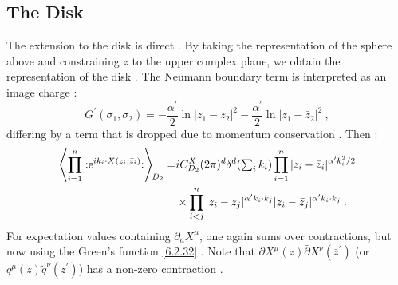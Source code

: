 \subsection*{The Disk}
The extension to the disk is direct . By taking the representation of the sphere above and constraining $z$ to the upper complex plane, we obtain the representation of the disk . The Neumann boundary term is interpreted as an image charge :
\begin{equation}
	G^{\prime}(\sigma_{1}, \sigma_{2})=-\frac{\alpha^{\prime}}{2} \ln |z_{1}-z_{2}|^{2}
	-\frac{\alpha^{\prime}}{2} \ln |z_{1}-\bar{z}_{2}|^{2} \:, \label{6.2.32}
\end{equation}
differing by a term that is dropped due to momentum conservation . Then :
\begin{align}
	\left\langle\prod_{i=1}^{n}: \mathrel{\mathrm{e}^{i k_{i} \cdot X(z_{i}, \bar{z}_{i})}}:\right\rangle \bigg._{\!\!D_{2}} 
	=& i C_{D_{2}}^{X} (2 \pi)^{d} \delta^{d}({\textstyle\sum_{i} k_{i}}) 
	\prod_{i=1}^{n}|z_{i}-\bar{z}_{i}|^{\alpha^{\prime} k_{i}^{2} / 2}  \nonumber \\
	& \times \prod_{ i<j}^{n} |z_{i}-z_{j}|^{\alpha^{\prime} k_{i} \cdot k_{j} }
	|z_{i}-\bar{z}_{j}|^{\alpha^{\prime} k_{i} \cdot k_{j}} \:. \label{6.2.33}
\end{align}
For expectation values containing $\partial_{a} X^{\mu}$, one again sums over contractions, but now using the Green's function \eqref{6.2.32} . Note that $\partial X^{\mu}(z) \bar{\partial} X^{\nu}(\bar{z}^{\prime})$ (or $q^{\mu}(z) \tilde{q}^{\nu}(\bar{z}^{\prime})$) has a non-zero contraction .

